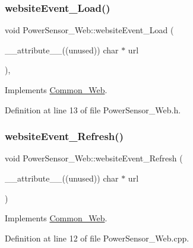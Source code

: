 \subsubsection{\texorpdfstring{website\+Event\+\_\+\+Load()}{websiteEvent\_Load()}}
{\footnotesize\ttfamily void Power\+Sensor\+\_\+\+Web\+::website\+Event\+\_\+\+Load (\begin{DoxyParamCaption}\item[{\+\_\+\+\_\+attribute\+\_\+\+\_\+((unused)) char $\ast$}]{url }\end{DoxyParamCaption})\hspace{0.3cm}{\ttfamily [inline]}, {\ttfamily [virtual]}}



Implements \hyperlink{class_common___web_a5ce0d5ce6f63279c3b624371d8a76211}{Common\+\_\+\+Web}.



Definition at line 13 of file Power\+Sensor\+\_\+\+Web.\+h.

\mbox{\label{class_power_sensor___web_a430e9c91f3fa760d7930cee367b92125}} 
\subsubsection{\texorpdfstring{website\+Event\+\_\+\+Refresh()}{websiteEvent\_Refresh()}}
{\footnotesize\ttfamily void Power\+Sensor\+\_\+\+Web\+::website\+Event\+\_\+\+Refresh (\begin{DoxyParamCaption}\item[{\+\_\+\+\_\+attribute\+\_\+\+\_\+((unused)) char $\ast$}]{url }\end{DoxyParamCaption})\hspace{0.3cm}{\ttfamily [virtual]}}



Implements \hyperlink{class_common___web_aaca7c54fdcf908e4e1256b7b1f6fc212}{Common\+\_\+\+Web}.



Definition at line 12 of file Power\+Sensor\+\_\+\+Web.\+cpp.

